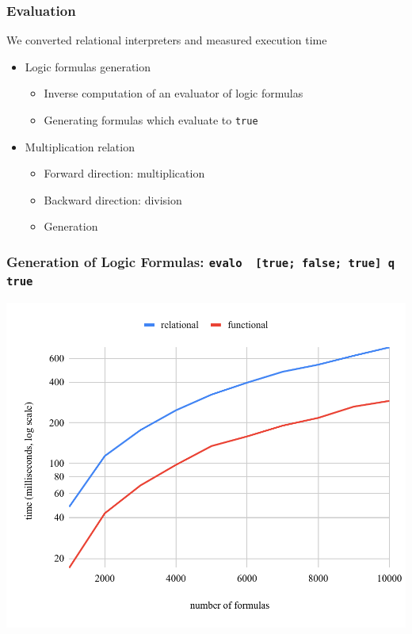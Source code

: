 \documentclass[xcolor=table, aspectratio=169]{beamer}
\begin{document}
\begin{frame}[fragile]
  \frametitle{Evaluation}
  \begin{center}
    We converted relational interpreters and measured execution time

\vfill

  \begin{minipage}{0.65\textwidth}
    \begin{itemize}
      \item Logic formulas generation
      \begin{itemize}
        \item Inverse computation of an evaluator of logic formulas
        \item Generating formulas which evaluate to \lstinline{true}
      \end{itemize}
      \item Multiplication relation
      \begin{itemize}
        \item Forward direction: multiplication
        \item Backward direction: division
        \item Generation
      \end{itemize}
    \end{itemize}
  \end{minipage}
\end{center}



\end{frame}

\begin{frame}[fragile]
  \frametitle{Generation of Logic Formulas: \lstinline[basicstyle=\Large]{evalo  [true; false; true] q true}}
  \begin{center}
    \includegraphics[height=0.85\textheight]{figures/propIOI.pdf}
  \end{center}
\end{frame}
\end{document}
